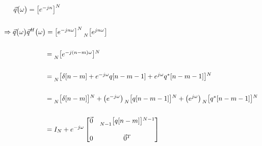 \documentclass{article}
\begin{document}
\begin{align*}
    &\quad \ \ \vec{q}\big(\omega\big) = \begin{bmatrix} e^{-jn} \end{bmatrix}^{N} \\ \\
    &\Rightarrow \vec{q}\big(\omega\big)\vec{q}^{H}\big(\omega\big) = \begin{bmatrix} e^{-jn\omega} \end{bmatrix}^{N}\prescript{}{N}{\begin{bmatrix} e^{jn\omega} \end{bmatrix}} \\ \\
    &\quad \quad \quad \quad \quad \quad \ = \prescript{}{N}{\begin{bmatrix} e^{-j(n - m)\omega} \end{bmatrix}}^{N} \\ \\
    &\quad \quad \quad \quad \quad \quad \ = \prescript{}{N}{\begin{bmatrix} \delta[n - m] + e^{-j\omega}q[n - m - 1] + e^{j\omega}q^{*}[n - m - 1] \end{bmatrix}}^{N} \\ \\
    &\quad \quad \quad \quad \quad \quad \ = \prescript{}{N}{\begin{bmatrix} \delta[n - m] \end{bmatrix}}^{N} +
                                             \big(e^{-j\omega}\big)\prescript{}{N}{\begin{bmatrix} q[n - m - 1] \end{bmatrix}}^{N} +
                                             \big(e^{j\omega}\big)\prescript{}{N}{\begin{bmatrix} q^{*}[n - m - 1] \end{bmatrix}}^{N} \\ \\
    &\quad \quad \quad \quad \quad \quad \ = I_{N} + e^{-j\omega}\begin{bmatrix}
                                                                    \vec{0} & \prescript{}{N - 1}{\begin{bmatrix} q[n - m] \end{bmatrix}}^{N - 1} \\ \\
                                                                         0  & \vec{0}^{T}
                                                                   \end{bmatrix}

\end{align*}
\end{document}
